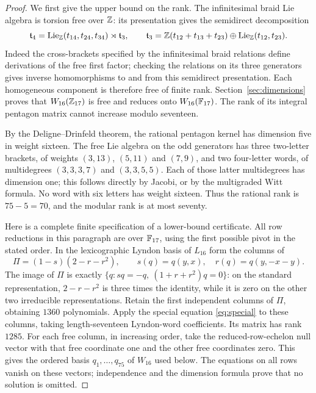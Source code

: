 \begin{proof}
We first give the upper bound on the rank.  The infinitesimal braid Lie
algebra is torsion free over $\mathbb Z$: its presentation gives the semidirect
decomposition
\[
 \mathfrak t_4=\operatorname{Lie}_\mathbb Z(t_{14},t_{24},t_{34})\rtimes\mathfrak t_3,
 \qquad
 \mathfrak t_3=\mathbb Z(t_{12}+t_{13}+t_{23})\oplus
                   \operatorname{Lie}_\mathbb Z(t_{12},t_{23}).
\]
Indeed the cross-brackets specified by the infinitesimal braid relations
define derivations of the free first factor; checking the relations on
its three generators gives inverse homomorphisms to and from this
semidirect presentation.  Each homogeneous component is therefore free
of finite rank.  Section~\ref{sec:dimensions} proves that
$W_{16}(\mathbb Z_{17})$ is free and reduces onto $W_{16}(\mathbb F_{17})$.
The rank of its integral pentagon matrix cannot increase modulo seventeen.

By the Deligne--Drinfeld theorem, the rational pentagon kernel has
dimension five in weight sixteen.  The free Lie algebra on the odd
generators has three two-letter brackets, of weights $(3,13)$, $(5,11)$
and $(7,9)$, and two four-letter words, of multidegrees $(3,3,3,7)$
and $(3,3,5,5)$.  Each of those latter multidegrees has dimension one;
this follows directly by Jacobi, or by the multigraded Witt formula.
No word with six letters has weight sixteen.  Thus the rational rank is
$75-5=70$, and the modular rank is at most seventy.

Here is a complete finite specification of a lower-bound certificate.
All row reductions in this paragraph are over $\mathbb F_{17}$, using the
first possible pivot in the stated order.  In the lexicographic Lyndon
basis of $L_{16}$ form the columns of
\[
 \Pi=(1-s)(2-r-r^2),\qquad
 s(q)=q(y,x),\quad r(q)=q(y,-x-y).
\]
The image of $\Pi$ is exactly
$\{q:sq=-q,\ (1+r+r^2)q=0\}$: on the standard representation,
$2-r-r^2$ is three times the identity, while it is zero on the other
two irreducible representations.  Retain the first independent columns
of $\Pi$, obtaining $1360$ polynomials.  Apply the special equation
\eqref{eq:special} to these columns, taking length-seventeen Lyndon-word
coefficients.  Its matrix has rank $1285$.  For each free column, in
increasing order, take the reduced-row-echelon null vector with that free
coordinate one and the other free coordinates zero.  This gives the
ordered basis $q_1,\ldots,q_{75}$ of $W_{16}$ used below.  The equations
on all rows vanish on these vectors; independence and the dimension
formula prove that no solution is omitted.


\end{proof}
